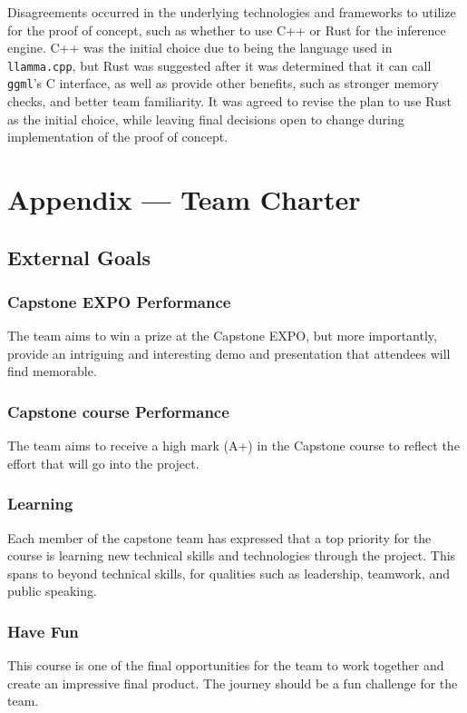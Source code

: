 \documentclass{article}
\begin{document}
\begin{enumerate}
    Disagreements occurred in the underlying technologies and frameworks to utilize for the proof of concept, such as whether to use C++ or Rust for the inference engine. C++ was the initial choice due to being the language used in \verb|llamma.cpp|, but Rust was suggested after it was determined that it can call \verb|ggml|'s C interface, as well as provide other benefits, such as stronger memory checks, and better team familiarity. It was agreed to revise the plan to use Rust as the initial choice, while leaving final decisions open to change during implementation of the proof of concept.

\end{enumerate}

\newpage{}

\section*{Appendix --- Team Charter}

\subsection*{External Goals}

\subsubsection{Capstone EXPO Performance}
The team aims to win a prize at the Capstone EXPO, but more importantly, provide an intriguing and interesting demo and presentation that attendees will find memorable.

\subsubsection{Capstone course Performance}
The team aims to receive a high mark (A+) in the Capstone course to reflect the effort that will go into the project.

\subsubsection{Learning}
Each member of the capstone team has expressed that a top priority for the course is learning new technical skills and technologies through the project. This spans to beyond technical skills, for qualities
such as leadership, teamwork, and public speaking.

\subsubsection{Have Fun}
This course is one of the final opportunities for the team to work together and create an impressive final product. The journey should be a fun challenge for the team.
\end{document}
